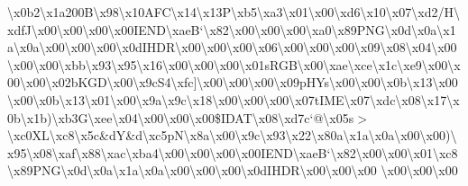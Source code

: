\textbackslash{}x0b2\textbackslash{}x1a200\+B\textbackslash{}x98\textbackslash{}x10\+A\+F\+C\textbackslash{}x14\textbackslash{}x13\+P\textbackslash{}xb5\textbackslash{}xa3\textbackslash{}x01\textbackslash{}x00\textbackslash{}xd6\textbackslash{}x10\textbackslash{}x07\textbackslash{}xd2/\+H\textbackslash{}xdf\+J\textbackslash{}x00\textbackslash{}x00\textbackslash{}x00\textbackslash{}x00\+I\+E\+N\+D\textbackslash{}xae\+B`\textbackslash{}x82\textbackslash{}x00\textbackslash{}x00\textbackslash{}x00\textbackslash{}xa0\textbackslash{}x89\+P\+N\+G\textbackslash{}x0d\textbackslash{}x0a\textbackslash{}x1a\textbackslash{}x0a\textbackslash{}x00\textbackslash{}x00\textbackslash{}x00\textbackslash{}x0d\+I\+H\+D\+R\textbackslash{}x00\textbackslash{}x00\textbackslash{}x00\textbackslash{}x06\textbackslash{}x00\textbackslash{}x00\textbackslash{}x00\textbackslash{}x09\textbackslash{}x08\textbackslash{}x04\textbackslash{}x00\textbackslash{}x00\textbackslash{}x00\textbackslash{}xbb\textbackslash{}x93\textbackslash{}x95\textbackslash{}x16\textbackslash{}x00\textbackslash{}x00\textbackslash{}x00\textbackslash{}x01s\+R\+G\+B\textbackslash{}x00\textbackslash{}xae\textbackslash{}xce\textbackslash{}x1c\textbackslash{}xe9\textbackslash{}x00\textbackslash{}x00\textbackslash{}x00\textbackslash{}x02b\+K\+G\+D\textbackslash{}x00\textbackslash{}x9c\+S4\textbackslash{}xfc\mbox{]}\textbackslash{}x00\textbackslash{}x00\textbackslash{}x00\textbackslash{}x09p\+H\+Ys\textbackslash{}x00\textbackslash{}x00\textbackslash{}x0b\textbackslash{}x13\textbackslash{}x00\textbackslash{}x00\textbackslash{}x0b\textbackslash{}x13\textbackslash{}x01\textbackslash{}x00\textbackslash{}x9a\textbackslash{}x9c\textbackslash{}x18\textbackslash{}x00\textbackslash{}x00\textbackslash{}x00\textbackslash{}x07t\+I\+M\+E\textbackslash{}x07\textbackslash{}xdc\textbackslash{}x08\textbackslash{}x17\textbackslash{}x0b\textbackslash{}x1b)\textbackslash{}xb3\+G\textbackslash{}xee\textbackslash{}x04\textbackslash{}x00\textbackslash{}x00\textbackslash{}x00\$\+I\+D\+A\+T\textbackslash{}x08\textbackslash{}xd7c`@\textbackslash{}x05s$>$\textbackslash{}xc0\+X\+L\textbackslash{}xc8\textbackslash{}x5c\&d\+Y\&d\textbackslash{}xc5p\+N\textbackslash{}x8a\textbackslash{}x00\textbackslash{}x9c\textbackslash{}x93\textbackslash{}x22\textbackslash{}x80a\textbackslash{}x1a\textbackslash{}x0a\textbackslash{}x00\textbackslash{}x00)\textbackslash{}x95\textbackslash{}x08\textbackslash{}xaf\textbackslash{}x88\textbackslash{}xac\textbackslash{}xba4\textbackslash{}x00\textbackslash{}x00\textbackslash{}x00\textbackslash{}x00\+I\+E\+N\+D\textbackslash{}xae\+B`\textbackslash{}x82\textbackslash{}x00\textbackslash{}x00\textbackslash{}x01\textbackslash{}xc8\textbackslash{}x89\+P\+N\+G\textbackslash{}x0d\textbackslash{}x0a\textbackslash{}x1a\textbackslash{}x0a\textbackslash{}x00\textbackslash{}x00\textbackslash{}x00\textbackslash{}x0d\+I\+H\+D\+R\textbackslash{}x00\textbackslash{}x00\textbackslash{}x00 \textbackslash{}x00\textbackslash{}x00\textbackslash{}x00 